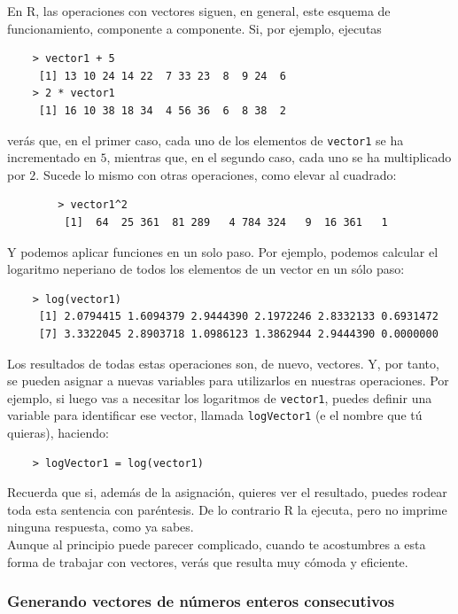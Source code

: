 \documentclass[10pt,a4paper]{article}\usepackage[]{graphicx}\usepackage[]{color}
\newcounter {cont01}
\begin{document}
En R, las operaciones con vectores siguen, en general, este esquema de funcionamiento, componente a componente. Si, por ejemplo, ejecutas
    \begin{verbatim}
    > vector1 + 5
     [1] 13 10 24 14 22  7 33 23  8  9 24  6
    > 2 * vector1
     [1] 16 10 38 18 34  4 56 36  6  8 38  2
    \end{verbatim}
verás que, en el primer caso, cada uno de los elementos de {\tt vector1} se ha incrementado en $5$, mientras que, en el segundo caso, cada uno se ha multiplicado por $2$. Sucede lo mismo con otras operaciones, como elevar al cuadrado:
    \begin{verbatim}
        > vector1^2
         [1]  64  25 361  81 289   4 784 324   9  16 361   1
    \end{verbatim}
Y podemos aplicar funciones en un solo paso. Por ejemplo, podemos calcular el logaritmo neperiano de todos los elementos de un vector en un sólo paso:
    \begin{verbatim}
    > log(vector1)
     [1] 2.0794415 1.6094379 2.9444390 2.1972246 2.8332133 0.6931472
     [7] 3.3322045 2.8903718 1.0986123 1.3862944 2.9444390 0.0000000
    \end{verbatim}
Los resultados de todas estas operaciones son, de nuevo, vectores. Y, por tanto, se pueden asignar a nuevas variables para utilizarlos en nuestras operaciones. Por ejemplo, si luego vas a necesitar los logaritmos de {\tt vector1}, puedes definir una variable para identificar ese vector, llamada {\tt logVector1} (e el nombre que tú quieras), haciendo:
    \begin{verbatim}
    > logVector1 = log(vector1)
    \end{verbatim}
Recuerda que si, además de la asignación, quieres ver el resultado, puedes rodear toda esta sentencia con paréntesis. De lo contrario R la ejecuta, pero no imprime ninguna respuesta, como ya sabes.\\

Aunque al principio puede parecer complicado, cuando te acostumbres a esta forma de trabajar con vectores, verás que resulta muy cómoda y eficiente.

\subsubsection*{Generando vectores de números enteros consecutivos}
\end{document}
